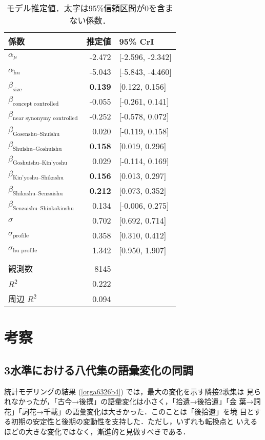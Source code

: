 \documentclass[submit]{ipsj}
\renewcommand{\ref}{\cref}
\begin{document}
\begin{table}[t]
\caption{\label{tab:orgd033db6}モデル推定値．太字は95\%信頼区間が0を含まない係数．}
\centering
\begin{tabular}{lrl}
係数 & 推定値 & 95\% CrI\\
\hline
\(\alpha_{\mu}\) & -2.472 & {[}-2.596, -2.342]\\
\(\alpha_{\text{hu}}\) & -5.043 & {[}-5.843, -4.460]\\
\(\beta_{\text{size}}\) & \textbf{0.139} & {[}0.122, 0.156]\\
\(\beta_{\text{concept controlled}}\) & -0.055 & {[}-0.261, 0.141]\\
\(\beta_{\text{near synonymy controlled}}\) & -0.252 & {[}-0.578, 0.072]\\
\(\beta_{\text{Gosenshu--Shuishu}}\) & 0.020 & {[}-0.119, 0.158]\\
\(\beta_{\text{Shuishu--Goshuishu}}\) & \textbf{0.158} & {[}0.019, 0.296]\\
\(\beta_{\text{Goshuishu--Kin'yoshu}}\) & 0.029 & {[}-0.114, 0.169]\\
\(\beta_{\text{Kin'yoshu--Shikashu}}\) & \textbf{0.156} & {[}0.013, 0.297]\\
\(\beta_{\text{Shikashu--Senzaishu}}\) & \textbf{0.212} & {[}0.073, 0.352]\\
\(\beta_{\text{Senzaishu--Shinkokinshu}}\) & 0.134 & {[}-0.006, 0.275]\\
\(\sigma\) & 0.702 & {[}0.692, 0.714]\\
\(\sigma_{\text{profile}}\) & 0.358 & {[}0.310, 0.412]\\
\(\sigma_{\text{hu profile}}\) & 1.342 & {[}0.950, 1.907]\\
 &  & \\
観測数 & 8145 & \\
\(R^2\) & 0.222 & \\
周辺 \(R^2\) & 0.094 & \\
\end{tabular}
\end{table}
\section{考察\label{org2fc8e65}}
\label{sec:org40d353a}
\subsection{3水準における八代集の語彙変化の同調\label{org7d32036}}
\label{sec:orgfbc69aa}
統計モデリングの結果 (\ref{orga6326b4}) では，最大の変化を示す隣接2歌集は
見られなかったが，「古今→後撰」の語彙変化は小さく，「拾遺→後拾遺」「金
葉→詞花」「詞花→千載」の語彙変化は大きかった．このことは「後拾遺」を境
目とする初期の安定性と後期の変動性を支持した．ただし，いずれも転換点と
いえるほどの大きな変化ではなく，漸進的と見做すべきである．
\end{document}

